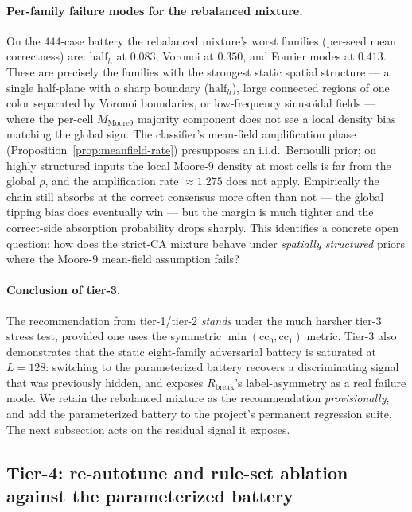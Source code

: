\documentclass[11pt,a4paper]{article}
\begin{document}
\paragraph{Per-family failure modes for the rebalanced mixture.}
On the \(444\)-case battery the rebalanced mixture's worst families
(per-seed mean correctness) are:
\(\mathrm{half}_h\) at \(0.083\), Voronoi at \(0.350\), and Fourier
modes at \(0.413\).  These are precisely the families with the
strongest static spatial structure --- a single half-plane with a
sharp boundary (\(\mathrm{half}_h\)), large connected regions of one
color separated by Voronoi boundaries, or low-frequency sinusoidal
fields --- where the per-cell \(M_{\mathrm{Moore9}}\) majority
component does not see a local density bias matching the global
sign.  The classifier's mean-field amplification phase
(Proposition~\ref{prop:meanfield-rate}) presupposes an i.i.d.\
Bernoulli prior; on highly structured inputs the local Moore-9
density at most cells is far from the global \(\rho\), and the
amplification rate \(\approx 1.275\) does not apply.  Empirically
the chain still absorbs at the correct consensus more often than
not --- the global tipping bias does eventually win --- but the
margin is much tighter and the correct-side absorption probability
drops sharply.  This identifies a concrete open question: how does
the strict-CA mixture behave under \emph{spatially structured}
priors where the Moore-9 mean-field assumption fails?

\paragraph{Conclusion of tier-3.}
The recommendation from tier-1/tier-2 \emph{stands} under the much
harsher tier-3 stress test, provided one uses the symmetric
\(\min(\mathrm{cc}_0, \mathrm{cc}_1)\) metric.  Tier-3 also
demonstrates that the static eight-family adversarial battery is
saturated at \(L = 128\): switching to the parameterized battery
recovers a discriminating signal that was previously hidden, and
exposes \(R_{\mathrm{break}}\)'s label-asymmetry as a real failure
mode.  We retain the rebalanced mixture as the recommendation
\emph{provisionally}, and add the parameterized battery to the
project's permanent regression suite.  The next subsection acts on
the residual signal it exposes.

\subsection{Tier-4: re-autotune and rule-set ablation against the
parameterized battery}
\label{subsec:tier-4}
\end{document}

